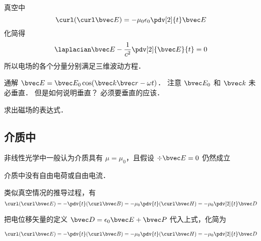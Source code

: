 
\begin{issues}
\issueDraft
{}
\end{issues}


真空中
\begin{equation}
\curl(\curl\bvec E) = -\mu_0\epsilon_0 \pdv[2]{t} \bvec E
\end{equation}
化简得
\begin{equation}
\laplacian \bvec E - \frac{1}{c^2} \pdv[2]{\bvec E}{t} = 0
\end{equation}
所以电场的各个分量分别满足三维波动方程．

通解 $\bvec E = \bvec E_0 \cos(\bvec k \bvec r - \omega t)$． 注意 $\bvec E_0$ 和 $\bvec k$ 未必垂直． 但是如何说明垂直？ 必须要垂直的应该．

求出磁场的表达式．

\subsection{介质中}

非线性光学中一般认为介质具有 $\mu = \mu_0$，且假设 $\div\bvec E = 0$ 仍然成立

介质中没有自由电荷或自由电流．

类似真空情况的推导过程，有
\begin{equation}
\curl(\curl\bvec E) = -\pdv{t} (\curl\bvec B) = -\mu_0 \pdv{t} (\curl\bvec H)
= -\mu_0 \pdv[2]{t} \bvec D
\end{equation}

把电位移矢量的定义 $\bvec D = \epsilon_0\bvec E + \bvec P$ 代入上式，化简为

\begin{equation}
\curl(\curl\bvec E) = -\pdv{t} (\curl\bvec B) = -\mu_0 \pdv{t} (\curl\bvec H)
= -\mu_0 \pdv[2]{t} \bvec D
\end{equation}